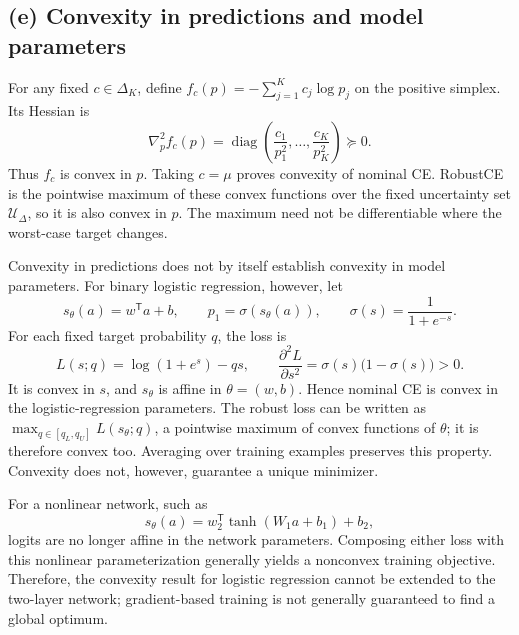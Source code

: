 \documentclass[11pt,a4paper]{article}
\newcommand{\UU}{\mathcal{U}_{\Delta}}
\begin{document}
\subsection*{(e) Convexity in predictions and model parameters}
For any fixed $c\in\Delta_K$, define
$f_c(p)=-\sum_{j=1}^K c_j\log p_j$ on the positive simplex. Its Hessian is
\begin{equation}
    \nabla_p^2 f_c(p)
    =\operatorname{diag}\!\left(\frac{c_1}{p_1^2},\ldots,
                                     \frac{c_K}{p_K^2}\right)\succeq0.
\end{equation}
Thus $f_c$ is convex in $p$. Taking $c=\mu$ proves convexity of nominal
CE. RobustCE is the pointwise maximum of these convex functions over the fixed
uncertainty set $\UU$, so it is also convex in $p$. The maximum need not be
differentiable where the worst-case target changes.

Convexity in predictions does not by itself establish convexity in model
parameters. For binary logistic regression, however, let
\begin{equation}
    s_\theta(a)=w^{\mathsf T}a+b,\qquad p_1=\sigma(s_\theta(a)),
    \qquad\sigma(s)=\frac{1}{1+e^{-s}}.
\end{equation}
For each fixed target probability $q$, the loss is
\begin{equation}
    L(s;q)=\log(1+e^s)-qs,
    \qquad \frac{\partial^2 L}{\partial s^2}
            =\sigma(s)\bigl(1-\sigma(s)\bigr)>0.
\end{equation}
It is convex in $s$, and $s_\theta$ is affine in $\theta=(w,b)$. Hence nominal
CE is convex in the logistic-regression parameters. The robust loss can be
written as $\max_{q\in[q_L,q_U]}L(s_\theta;q)$, a pointwise maximum of convex
functions of $\theta$; it is therefore convex too. Averaging over training
examples preserves this property. Convexity does not, however, guarantee a
unique minimizer.

For a nonlinear network, such as
\begin{equation}
    s_\theta(a)=w_2^{\mathsf T}\tanh(W_1a+b_1)+b_2,
\end{equation}
logits are no longer affine in the network parameters. Composing either loss
with this nonlinear parameterization generally yields a nonconvex training
objective. Therefore, the convexity result for logistic regression cannot be
extended to the two-layer network; gradient-based training is not generally
guaranteed to find a global optimum.
\end{document}
